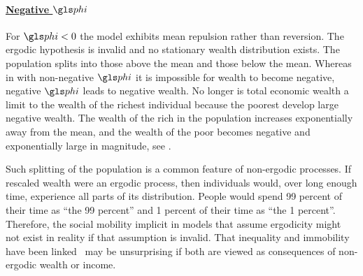 \paragraph{\underline{Negative $\gphi$}}
\mbox{}

For $\gphi<0$ the model exhibits mean repulsion rather than reversion. The ergodic hypothesis is invalid and no stationary wealth distribution exists. The population splits into those above the mean and those below the mean. Whereas in \RGBM with non-negative $\gphi$ it is impossible for wealth to become negative, negative $\gphi$ leads to negative wealth. No longer is total economic wealth a limit to the wealth of the richest individual because the poorest develop large negative wealth. The wealth of the rich in the population increases exponentially away from the mean, and the wealth of the poor becomes negative and exponentially large in magnitude, see .

Such splitting of the population is a common feature of non-ergodic processes. If rescaled wealth were an ergodic process, then individuals would, over long enough time, experience all parts of its distribution. People would spend 99 percent of their time as ``the 99 percent'' and 1 percent of their time as ``the 1 percent''. Therefore, the social mobility implicit in models that assume ergodicity might not exist in reality if that assumption is invalid. That inequality and immobility have been linked~\cite{Corak2013,LiuETAL2013,berman2017} may be unsurprising if both are viewed as consequences of non-ergodic wealth or income.

